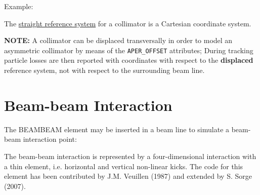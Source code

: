 {\begin{5.02.05}
Example: 

The \hyperref[subsec:local_straight]{straight reference system} for a
collimator is a Cartesian coordinate system.  

\textbf{NOTE:} A collimator can be displaced transversally in order to
model an asymmetric collimator by means of the {\tt APER\_OFFSET} attributes; 
During tracking particle losses are then reported with coordinates with respect 
to the \textbf{displaced} reference system, not with respect to the surrounding 
beam line.

\end{5.02.05}



\section{Beam-beam Interaction}
The BEAMBEAM element may be inserted in a beam line to simulate a
beam-beam interaction point:  
 

The beam-beam interaction is represented by a four-dimensional
interaction with a thin element, i.e. horizontal and vertical non-linear kicks.
The code for this element has been contributed by J.M. Veuillen (1987)
and extended by S. Sorge (2007).  
 
}
